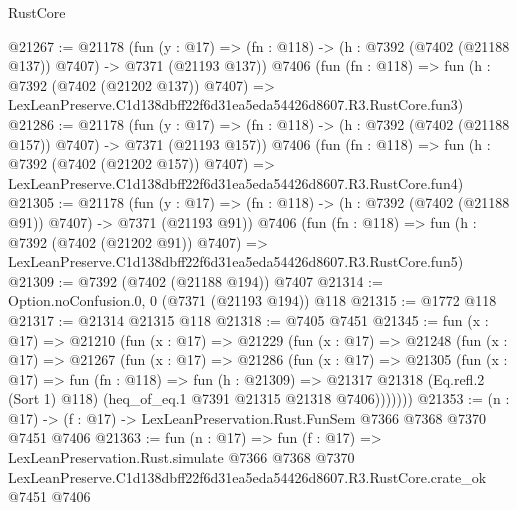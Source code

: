 \begin{lexlean}{RustCore}
\begin{coremodule}
@21267 := @21178
    (fun (y : @17) => (fn : @118) -> (h : @7392 (@7402 (@21188 @137)) @7407) -> @7371 (@21193 @137))
    @7406
    (fun (fn : @118) =>
    fun (h : @7392 (@7402 (@21202 @137)) @7407) =>
    LexLeanPreserve.C1d138dbff22f6d31ea5eda54426d8607.R3.RustCore.fun3)
@21286 := @21178
    (fun (y : @17) => (fn : @118) -> (h : @7392 (@7402 (@21188 @157)) @7407) -> @7371 (@21193 @157))
    @7406
    (fun (fn : @118) =>
    fun (h : @7392 (@7402 (@21202 @157)) @7407) =>
    LexLeanPreserve.C1d138dbff22f6d31ea5eda54426d8607.R3.RustCore.fun4)
@21305 := @21178
    (fun (y : @17) => (fn : @118) -> (h : @7392 (@7402 (@21188 @91)) @7407) -> @7371 (@21193 @91))
    @7406
    (fun (fn : @118) =>
    fun (h : @7392 (@7402 (@21202 @91)) @7407) =>
    LexLeanPreserve.C1d138dbff22f6d31ea5eda54426d8607.R3.RustCore.fun5)
@21309 := @7392 (@7402 (@21188 @194)) @7407
@21314 := Option.noConfusion.{0, 0} (@7371 (@21193 @194)) @118
@21315 := @1772 @118
@21317 := @21314 @21315 @118
@21318 := @7405 @7451
@21345 := fun (x : @17) =>
  @21210
    (fun (x : @17) =>
    @21229
      (fun (x : @17) =>
      @21248
        (fun (x : @17) =>
        @21267
          (fun (x : @17) =>
          @21286
            (fun (x : @17) =>
            @21305
              (fun (x : @17) =>
              fun (fn : @118) =>
              fun (h : @21309) =>
              @21317
                @21318
                (Eq.refl.{2} (Sort 1) @118)
                (heq_of_eq.{1} @7391 @21315 @21318 @7406)))))))
@21353 := (n : @17) -> (f : @17) -> LexLeanPreservation.Rust.FunSem @7366 @7368 @7370 @7451 @7406
@21363 := fun (n : @17) =>
  fun (f : @17) =>
  LexLeanPreservation.Rust.simulate
    @7366
    @7368
    @7370
    LexLeanPreserve.C1d138dbff22f6d31ea5eda54426d8607.R3.RustCore.crate_ok
    @7451
    @7406
\end{coremodule}
\end{lexlean}
